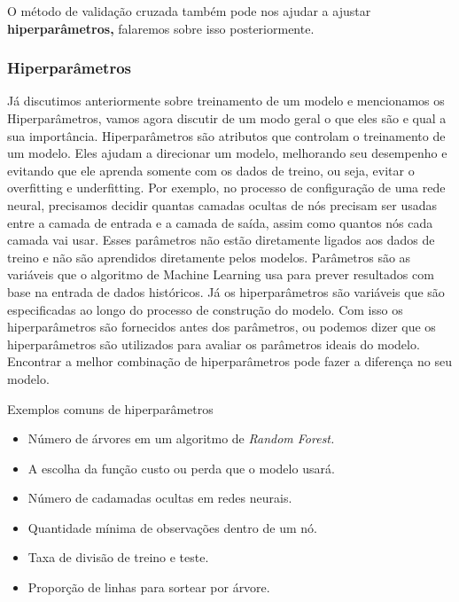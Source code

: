 \documentclass[
  letterpaper,
  DIV=11,
  numbers=noendperiod]{scrreprt}
\begin{document}
O método de validação cruzada também pode nos ajudar a ajustar
\textbf{hiperparâmetros,} falaremos sobre isso posteriormente.

\hypertarget{hiperparuxe2metros}{%
\subsubsection{Hiperparâmetros}\label{hiperparuxe2metros}}

Já discutimos anteriormente sobre treinamento de um modelo e mencionamos
os Hiperparâmetros, vamos agora discutir de um modo geral o que eles são
e qual a sua importância. Hiperparâmetros são atributos que controlam o
treinamento de um modelo. Eles ajudam a direcionar um modelo, melhorando
seu desempenho e evitando que ele aprenda somente com os dados de
treino, ou seja, evitar o overfitting e underfitting. Por exemplo, no
processo de configuração de uma rede neural, precisamos decidir quantas
camadas ocultas de nós precisam ser usadas entre a camada de entrada e a
camada de saída, assim como quantos nós cada camada vai usar. Esses
parâmetros não estão diretamente ligados aos dados de treino e não são
aprendidos diretamente pelos modelos. Parâmetros são as variáveis
\hspace{0pt}\hspace{0pt}que o algoritmo de Machine Learning usa para
prever resultados com base na entrada de dados históricos. Já os
hiperparâmetros são variáveis \hspace{0pt}\hspace{0pt}que são
especificadas ao longo do processo de construção do modelo. Com isso os
hiperparâmetros são fornecidos antes dos parâmetros, ou podemos dizer
que os hiperparâmetros são utilizados para avaliar os parâmetros ideais
do modelo. Encontrar a melhor combinação de hiperparâmetros pode fazer a
diferença no seu modelo.

Exemplos comuns de hiperparâmetros

\begin{itemize}
\item
  Número de árvores em um algoritmo de \emph{Random Forest.}
\item
  A escolha da função custo ou perda que o modelo usará.
\item
  Número de cadamadas ocultas em redes neurais.
\item
  Quantidade mínima de observações dentro de um nó.
\item
  Taxa de divisão de treino e teste.
\item
  Proporção de linhas para sortear por árvore.
\end{itemize}
\end{document}

